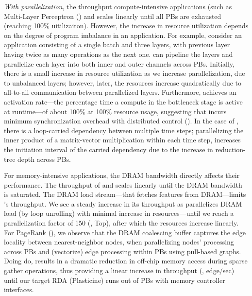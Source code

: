 {\em With parallelization}, the throughput compute-intensive applications (such as Multi-Layer Perceptron () and  scales linearly until all PBs are exhausted (reaching 100\% uitilizaiton).
However, the increase in resource utilization depends on the degree of program imbalance in an application.
For example, consider an  application consisting of a single batch and three layers, with previous layer having twice as many operations as the next one.
\name{} can pipeline the layers and parallelize each layer into both inner and outer channels across PBs. 
Initially, there is a small increase in resource utilization as we increase parallelization, due to unbalanced layers; however, later, the resources increase quadratically due to all-to-all communication between parallelized layers.
Furthermore,  achieves an activation rate---the percentage time a compute in the bottleneck stage is active at runtime---of about 100\% at 100\% resource usage, suggesting that  incurs minimum synchronization overhead with distributed control ().
In the case of , there is a loop-carried dependency between multiple time steps; parallelizing the inner product of a matrix-vector multiplication within each time step, increases the initiation interval of the carried dependency due to the increase in reduction-tree depth across PBs.

For memory-intensive applications, the DRAM bandwidth directly affects their performance.
The throughput of  and  scales linearly until the DRAM bandwidth is saturated.
The DRAM load stream---that fetches features from DRAM---limits 's throughput.
We see a steady increase in its throughput as \name{} parallelizes DRAM load (by loop unrolling) with minimal increase in resources---until we reach a parallelization factor of 150 (, Top), after which the resources increase linearly.
For PageRank (), we observe that the DRAM coalescing buffer captures the edge locality between nearest-neighbor nodes, when parallelizing nodes' processing across PBs and (vectorize) edge processing within PBs using pull-based graphs.
Doing do, results in a dramatic reduction in off-chip memory access during sparse gather operations, thus providing a linear increase in throughput (\ie, edge/sec) until our target RDA (Plasticine) runs out of PBs with memory controller interfaces.

